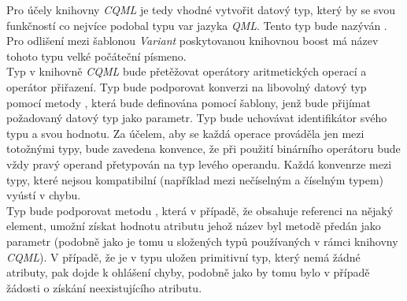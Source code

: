 \documentclass[11pt,twoside,a4paper]{book}
\begin{document}
{{\begin{ttemize}
{{Pro účely knihovny \textit{CQML} je tedy vhodné vytvořit datový typ, který by se svou funkčností co nejvíce podobal typu var jazyka \textit{QML}. Tento typ bude nazýván . Pro odlišení mezi šablonou \textit{Variant} poskytovanou knihovnou boost má název tohoto typu velké počáteční písmeno.\\
Typ  v knihovně \textit{CQML} bude přetěžovat operátory aritmetických operací a operátor přiřazení. Typ  bude podporovat konverzi na libovolný datový typ pomocí metody , která bude definována pomocí šablony, jenž bude přijímat požadovaný datový typ jako parametr. Typ  bude uchovávat identifikátor svého typu a svou hodnotu. Za účelem, aby se každá operace prováděla jen mezi totožnými typy, bude zavedena konvence, že při použití binárního operátoru bude vždy pravý operand přetypován na typ levého operandu. Každá konvenrze mezi typy, které nejsou kompatibilní (například mezi nečíselným a číselným typem) vyústí v chybu.\\
Typ  bude podporovat metodu , která v případě, že  obsahuje referenci na nějaký element, umožní získat hodnotu atributu jehož název byl metodě předán jako parametr (podobně jako je tomu u složených typů používaných v rámci knihovny \textit{CQML}). V případě, že je v typu  uložen primitivní typ, který nemá žádné atributy, pak dojde k ohlášení chyby, podobně jako by tomu bylo v případě žádosti o získání neexistujícího atributu.\\

}}
\end{ttemize}}}
\end{document}
